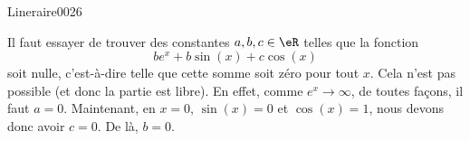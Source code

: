 \begin{corrige}{Lineraire0026}

	Il faut essayer de trouver des constantes $a,b,c\in\eR$ telles que la fonction 
	\begin{equation}
		b e^{x}+b\sin(x)+c\cos(x)
	\end{equation}
	soit nulle, c'est-à-dire telle que cette somme soit zéro pour tout $x$. Cela n'est pas possible (et donc la partie est libre). En effet, comme $ e^{x}\to\infty$, de toutes façons, il faut $a=0$. Maintenant, en $x=0$, $\sin(x)=0$ et $\cos(x)=1$, nous devons donc avoir $c=0$. De là, $b=0$.

\end{corrige}

